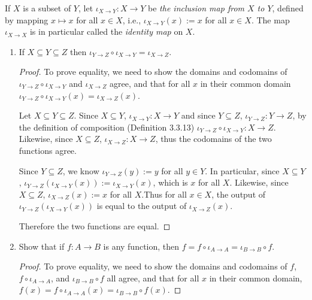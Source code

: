 \documentclass[../../main.tex]{subfiles}
\begin{document}
\begin{q}
    If $X$ is a subset of $Y$, let $\iota_{X\to Y} : X \to Y$ be \emph{the inclusion map from $X$ to $Y$}, defined by mapping $x \mapsto x$ for all $x \in X$, i.e., $\iota_{X\to Y}(x) := x$ for all $x \in X$.
    The map $\iota_{X\to X}$ is in particular called the \emph{identity map} on $X$.
\end{q}
\begin{enumerate}
    \item
    \begin{q}
        If $X \subseteq Y \subseteq Z$ then $\iota_{Y\to Z} \circ \iota_{X\to Y} = \iota_{X\to Z}$.
    \end{q}

    \begin{proof}
        To prove equality, we need to show the domains and codomains of $\iota_{Y\to Z} \circ \iota_{X\to Y}$ and $\iota_{X\to Z}$ agree, and that for all $x$ in their common domain $\iota_{Y\to Z} \circ \iota_{X\to Y}(x) = \iota_{X\to Z}(x)$.

        Let $X \subseteq Y \subseteq Z$. Since $X \subseteq Y$, $\iota_{X\to Y}: X \to Y$ and since $Y \subseteq Z$, $\iota_{Y\to Z}: Y \to Z$, by the definition of composition (Definition 3.3.13) $\iota_{Y\to Z} \circ \iota_{X\to Y}: X \to Z$. Likewise, since $X \subseteq Z$, $\iota_{X\to Z}: X \to Z$, thus the codomains of the two functions agree.

        Since $Y \subseteq Z$, we know $\iota_{Y\to Z}(y) := y$ for all $y \in Y$.
        In particular, since $X \subseteq Y$, $\iota_{Y\to Z}(\iota_{X\to Y}(x)) := \iota_{X\to Y}(x)$, which is $x$ for all $X$.
        Likewise, since $X \subseteq Z$, $\iota_{X\to Z}(x) := x$ for all $X$.Thus for all $x \in X$, the output of $\iota_{Y\to Z}(\iota_{X\to Y}(x))$ is equal to the output of $\iota_{X\to Z}(x)$.

        Therefore the two functions are equal.
    \end{proof}

    \item 
    \begin{q}
        Show that if $f: A \to B$ is any function, then $f = f \circ \iota_{A \to A} = \iota_{B \to B} \circ f$.
    \end{q}

    \begin{proof}
        To prove equality, we need to show the domains and codomains of $f$, $f \circ \iota_{A \to A}$, and $\iota_{B \to B} \circ f$ all agree, and that for all $x$ in their common domain, $f(x) = f \circ \iota_{A \to A}(x) = \iota_{B \to B} \circ f(x)$.


\end{proof}
\end{enumerate}
\end{document}
